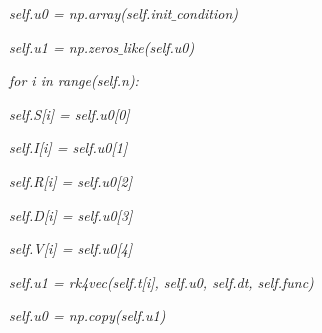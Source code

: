 \documentclass[14pt]{amsart}
\begin{document}
\textit{self.u0 = np.array(self.init$\_$condition)}

\textit{self.u1 = np.zeros$\_$like(self.u0)}

\textit{for i in range(self.n):}

\textit{self.S[i] = self.u0[0]}

\textit{self.I[i] = self.u0[1]}

\textit{self.R[i] = self.u0[2]}

\textit{self.D[i] = self.u0[3]}

\textit{self.V[i] = self.u0[4]}

\textit{self.u1 = rk4vec(self.t[i], self.u0, self.dt, self.func)}

\textit{self.u0 = np.copy(self.u1)}
\end{document}
